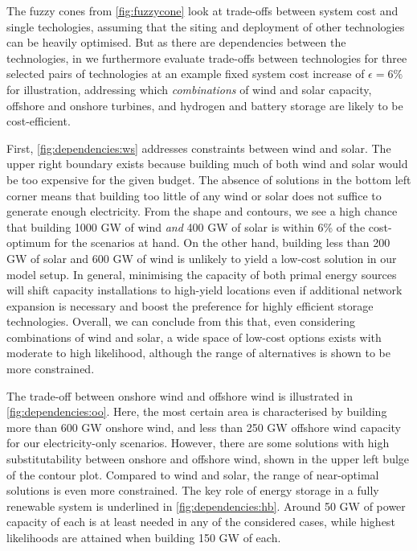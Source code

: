 The fuzzy cones from \cref{fig:fuzzycone} look at trade-offs between system cost
and single techologies, assuming that the siting and deployment of other
technologies can be heavily optimised. But as there are dependencies between the
technologies, in  we
furthermore evaluate trade-offs between technologies for three selected pairs of
technologies at an example fixed system cost increase of $\epsilon=6\%$ for
illustration, addressing which \textit{combinations} of wind and solar capacity,
offshore and onshore turbines, and hydrogen and battery storage are likely to be
cost-efficient.

First, \cref{fig:dependencies:ws} addresses constraints between wind and solar.
The upper right boundary exists because building much of both wind and solar
would be too expensive for the given budget. The absence of solutions in the
bottom left corner means that building too little of any wind or solar does not
suffice to generate enough electricity. From the shape and contours, we see a
high chance that building 1000 GW of wind \textit{and} 400 GW of solar is within
6\% of the cost-optimum for the scenarios at hand. On the other hand, building
less than 200 GW of solar and 600 GW of wind is unlikely to yield a low-cost
solution in our model setup. In general, minimising the capacity of both primal
energy sources will shift capacity installations to high-yield locations even if
additional network expansion is necessary and boost the preference for highly
efficient storage technologies. Overall, we can conclude from this that, even
considering combinations of wind and solar, a wide space of low-cost options
exists with moderate to high likelihood, although the range of alternatives is
shown to be more constrained.

The trade-off between onshore wind and offshore wind is illustrated in
\cref{fig:dependencies:oo}. Here, the most certain area is characterised by
building more than 600 GW onshore wind, and less than 250 GW offshore wind
capacity for our electricity-only scenarios. However, there are some solutions
with high substitutability between onshore and offshore wind, shown in the upper
left bulge of the contour plot. Compared to wind and solar, the range of
near-optimal solutions is even more constrained. The key role of energy storage
in a fully renewable system is underlined in \cref{fig:dependencies:hb}. Around
50 GW of power capacity of each is at least needed in any of the considered
cases, while highest likelihoods are attained when building 150 GW of each.

